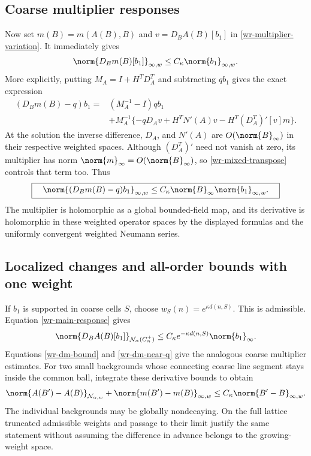 \subsection{Coarse multiplier responses}
\label{wr-multiplier-responses}

Now set $m(B)=m(A(B),B)$ and
$v=D_BA(B)[b_1]$ in \eqref{wr-multiplier-variation}. It immediately
gives
\begin{equation}\label{wr-dm-bound}
 \norm{D_Bm(B)[b_1]}_{\infty,w}
 \le C_\kappa\norm{b_1}_{\infty,w}.
\end{equation}
More explicitly, putting $M_A=I+H^TD_A^T$ and subtracting
$qb_1$ gives the exact expression
\begin{equation}\label{wr-dm-remainder}
 \begin{split}
 (D_Bm(B)-q)b_1={}&(M_A^{-1}-I)qb_1\\
 &+M_A^{-1}\{-qD_Av+H^TN'(A)v-H^T(D_A^T)'[v]m\}.
 \end{split}
\end{equation}
At the solution the inverse difference, $D_A$, and $N'(A)$
are $O(\norm{B}_\infty)$ in their respective weighted spaces.
Although $(D_A^T)'$ need not vanish at zero, its multiplier
has norm $\norm{m}_\infty=O(\norm{B}_\infty)$, so
\eqref{wr-mixed-transpose} controls that term too. Thus
\begin{equation}\label{wr-dm-near-q}
 \boxed{\quad
 \norm{(D_Bm(B)-q)b_1}_{\infty,w}
 \le C_\kappa\norm{B}_\infty\norm{b_1}_{\infty,w}.
 \quad}
\end{equation}
The multiplier is holomorphic as a global bounded-field map,
and its derivative is holomorphic in these weighted operator
spaces by the displayed formulas and the uniformly convergent
weighted Neumann series.

\subsection{Localized changes and all-order bounds with one weight}
\label{wr-localization}

If $b_1$ is supported in coarse cells $S$, choose
$w_S(n)=e^{\kappa d(n,S)}$. This is admissible. Equation
\eqref{wr-main-response} gives
\begin{equation}\label{wr-local-response}
 \norm{D_BA(B)[b_1]}_{\mathcal N_\alpha(C_n^+)}
 \le C_\kappa e^{-\kappa d(n,S)}\norm{b_1}_\infty.
\end{equation}
Equations \eqref{wr-dm-bound} and \eqref{wr-dm-near-q}
give the analogous coarse multiplier estimates. For two small
backgrounds whose connecting coarse line segment stays inside
the common ball, integrate these derivative bounds to obtain
\begin{equation}\label{wr-finite-difference}
 \norm{A(B')-A(B)}_{\mathcal N_{\alpha,w}}
 +\norm{m(B')-m(B)}_{\infty,w}
 \le C_\kappa\norm{B'-B}_{\infty,w}.
\end{equation}
The individual backgrounds may be globally nondecaying. On the
full lattice truncated admissible weights and passage to their
limit justify the same statement without assuming the difference
in advance belongs to the growing-weight space.

